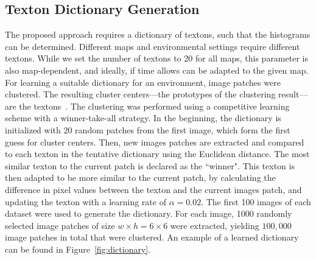 \subsection{Texton Dictionary Generation}
\label{sec:text-dict-gener}

The proposed approach requires a dictionary of textons, such that the histograms can be determined. Different maps and environmental settings require different textons. While we set the number of textons to 20 for all maps, this parameter is also map-dependent, and ideally, if time allows can be adapted to the given map. For learning a suitable dictionary for an environment, image patches were clustered. The resulting cluster centers---the prototypes of the
clustering result---are the textons~\cite{varma2003texture}.  The clustering was performed using a competitive learning scheme with a winner-take-all strategy. 
In the beginning, the dictionary is initialized with 20 random patches from the first image, which form the first guess for cluster centers. Then, new images patches are extracted and  compared to each texton in the tentative dictionary using the Euclidean distance. The most similar texton to the current patch is declared as the ``winner". This texton is then adapted to be more similar to the current patch, by calculating the difference in pixel values between the texton and the current images patch, and updating the texton with a learning rate of $\alpha = 0.02$. The first 100 images of each dataset were used to generate the dictionary. For each image, 1000 randomly selected image patches of size $w \times h = 6 \times 6$ were extracted, yielding $100,000$ image patches in total that were clustered.  An example of a learned dictionary can be found in Figure~\ref{fig:dictionary}.